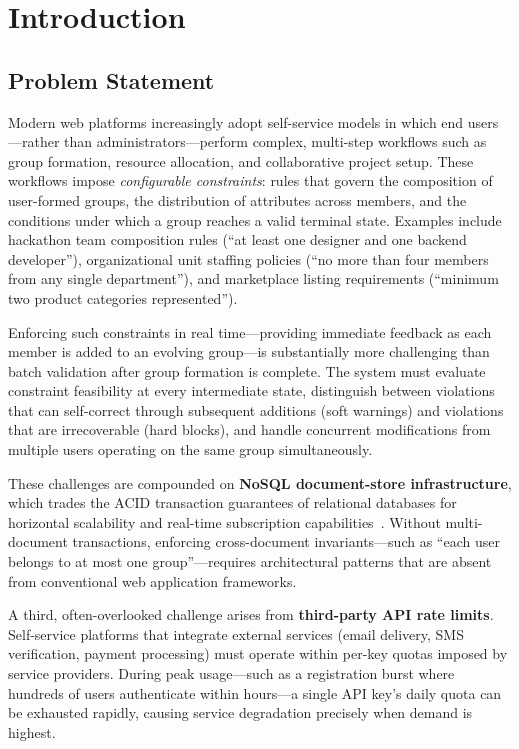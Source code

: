 \documentclass[11pt,a4paper]{article}
\theoremstyle{plain}
\theoremstyle{definition}
\begin{document}
\section{Introduction}
\label{sec:introduction}

\subsection{Problem Statement}

Modern web platforms increasingly adopt self-service models in which end users---rather than administrators---perform complex, multi-step workflows such as group formation, resource allocation, and collaborative project setup. These workflows impose \emph{configurable constraints}: rules that govern the composition of user-formed groups, the distribution of attributes across members, and the conditions under which a group reaches a valid terminal state. Examples include hackathon team composition rules (``at least one designer and one backend developer''), organizational unit staffing policies (``no more than four members from any single department''), and marketplace listing requirements (``minimum two product categories represented'').

Enforcing such constraints in real time---providing immediate feedback as each member is added to an evolving group---is substantially more challenging than batch validation after group formation is complete. The system must evaluate constraint feasibility at every intermediate state, distinguish between violations that can self-correct through subsequent additions (soft warnings) and violations that are irrecoverable (hard blocks), and handle concurrent modifications from multiple users operating on the same group simultaneously.

These challenges are compounded on \textbf{NoSQL document-store infrastructure}, which trades the ACID transaction guarantees of relational databases for horizontal scalability and real-time subscription capabilities~\cite{cattell2010, vogels2009}. Without multi-document transactions, enforcing cross-document invariants---such as ``each user belongs to at most one group''---requires architectural patterns that are absent from conventional web application frameworks.

A third, often-overlooked challenge arises from \textbf{third-party API rate limits}. Self-service platforms that integrate external services (email delivery, SMS verification, payment processing) must operate within per-key quotas imposed by service providers. During peak usage---such as a registration burst where hundreds of users authenticate within hours---a single API key's daily quota can be exhausted rapidly, causing service degradation precisely when demand is highest.
\end{document}

